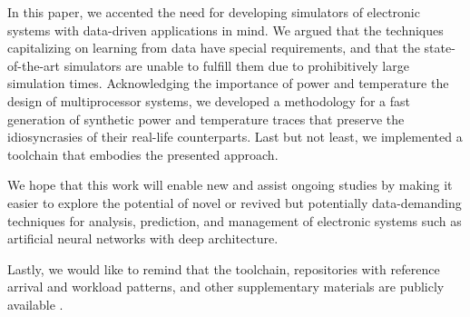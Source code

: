 In this paper, we accented the need for developing simulators of electronic
systems with data-driven applications in mind. We argued that the techniques
capitalizing on learning from data have special requirements, and that the
state-of-the-art simulators are unable to fulfill them due to prohibitively
large simulation times. Acknowledging the importance of power and temperature
the design of multiprocessor systems, we developed a methodology for a fast
generation of synthetic power and temperature traces that preserve the
idiosyncrasies of their real-life counterparts. Last but not least, we
implemented a toolchain that embodies the presented approach.

We hope that this work will enable new and assist ongoing studies by making it
easier to explore the potential of novel or revived but potentially
data-demanding techniques for analysis, prediction, and management of electronic
systems such as artificial neural networks with deep architecture.

Lastly, we would like to remind that the toolchain, repositories with reference
arrival and workload patterns, and other supplementary materials are publicly
available \cite{sources}.
